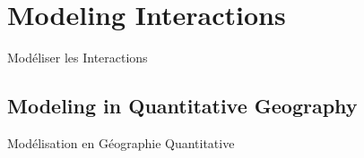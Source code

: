 




\newpage

\section{Modeling Interactions}{Modéliser les Interactions}
\label{sec:modelingsa}






\subsection{Modeling in Quantitative Geography}{Modélisation en Géographie Quantitative}



